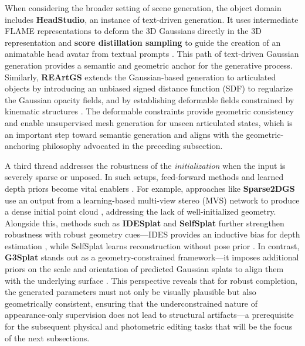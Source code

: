 \documentclass[11pt,a4paper]{article}
\begin{document}
When considering the broader setting of scene generation, the object domain includes \textbf{HeadStudio}, an instance of text-driven generation. It uses intermediate FLAME representations to deform the 3D Gaussians directly in the 3D representation and \textbf{score distillation sampling} to guide the creation of an animatable head avatar from textual prompts \cite{arxiv:2402.06149v1}. This path of text-driven Gaussian generation provides a semantic and geometric anchor for the generative process. Similarly, \textbf{REArtGS} extends the Gaussian-based generation to articulated objects by introducing an unbiased signed distance function (SDF) to regularize the Gaussian opacity fields, and by establishing deformable fields constrained by kinematic structures \cite{arxiv:2503.06677v5}. The deformable constraints provide geometric consistency and enable unsupervised mesh generation for unseen articulated states, which is an important step toward semantic generation and aligns with the geometric-anchoring philosophy advocated in the preceding subsection.

A third thread addresses the robustness of the \emph{initialization} when the input is severely sparse or unposed. In such setups, feed-forward methods and learned depth priors become vital enablers \cite{arxiv:2410.13862v3}. For example, approaches like \textbf{Sparse2DGS} use an output from a learning-based multi-view stereo (MVS) network to produce a dense initial point cloud \cite{arxiv:2504.20378v1}, addressing the lack of well-initialized geometry. Alongside this, methods such as \textbf{IDESplat} and \textbf{SelfSplat} further strengthen robustness with robust geometry cues---IDES provides an inductive bias for depth estimation \cite{arxiv:2601.03824v3}, while SelfSplat learns reconstruction without pose prior \cite{arxiv:2411.17190v5}. In contrast, \textbf{G3Splat} stands out as a geometry-constrained framework---it imposes additional priors on the scale and orientation of predicted Gaussian splats to align them with the underlying surface \cite{arxiv:2512.17547v2}. This perspective reveals that for robust completion, the generated parameters must not only be visually plausible but also geometrically consistent, ensuring that the underconstrained nature of appearance-only supervision does not lead to structural artifacts---a prerequisite for the subsequent physical and photometric editing tasks that will be the focus of the next subsections.
\end{document}
